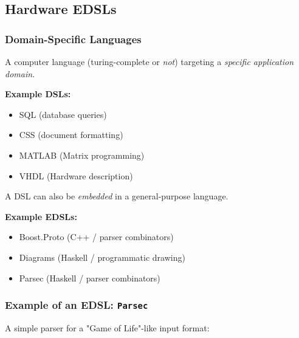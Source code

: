     \subsection{Hardware EDSLs}
    \label{subsec:hardware-edsls}
        \begin{frame}
            \frametitle{Domain-Specific Languages}

            \par{A computer language (turing-complete or \emph{not})
                targeting a \emph{specific application domain.}}

            \par{\textbf{Example DSLs:}}
            \begin{itemize}
                \item SQL (database queries)
                \item CSS (document formatting)
                \item MATLAB (Matrix programming)
                \item VHDL (Hardware description)
            \end{itemize}

            \pause

            \par{A DSL can also be \emph{embedded} in a general-purpose language.}
            \par{\textbf{Example EDSLs:}}
            \begin{itemize}
                \item Boost.Proto (C++ / parser combinators)
                \item Diagrams (Haskell / programmatic drawing)
                \item Parsec (Haskell / parser combinators)
            \end{itemize}
        \end{frame}

        \begin{frame}
            \frametitle{Example of an EDSL: \texttt{Parsec}}

            A simple parser for a "Game of Life"-like input format:
        \end{frame}

